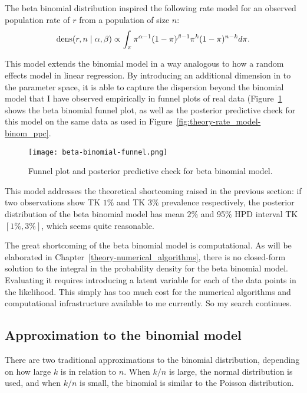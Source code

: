 The beta binomial distribution inspired the following rate model for
an observed population rate of $r$ from a population of size $n$:
\[
\operatorname{dens}(r,n\;|\; \alpha, \beta) \propto \int_{\pi}
\pi^{\alpha-1}(1-\pi)^{\beta-1} \pi^k (1-\pi)^{n-k}
d\pi.
\]

This model extends the binomial model in a way analogous to how a
random effects model in linear regression.  By introducing an
additional dimension in to the parameter space, it is able to capture
the dispersion beyond the binomial model that I have observed
empirically in funnel plots of real data
(Figure~\ref{fig:theory-rate_beta-binomial-funnel} shows the beta
binomial funnel plot, as well as the posterior predictive check for
this model on the same data as used in
Figure~\ref{fig:theory-rate_model-binom_ppc}.

\begin{figure}[ht]
\begin{center}
\texttt{[image: beta-binomial-funnel.png]}
\end{center}
\caption{Funnel plot and posterior predictive check for beta binomial model.}
\label{fig:theory-rate_beta-binomial-funnel}
\end{figure}

This model addresses the theoretical shortcoming raised in the
previous section: if two observations show TK $1\%$ and TK $3\%$ prevalence
respectively, the posterior distribution of the beta binomial model
has mean $2\%$ and 95\% HPD interval TK $[1\%,3\%]$, which seems quite
reasonable.

The great shortcoming of the beta binomial model is computational.  As
will be elaborated in Chapter~\ref{theory-numerical_algorithms}, there
is no closed-form solution to the integral in the probability density
for the beta binomial model.  Evaluating it requires introducing a
latent variable for each of the data points in the likelihood.  This
simply has too much cost for the numerical algorithms and
computational infrastructure available to me currently.  So my search
continues.

\subsection{Approximation to the binomial model}
There are two traditional approximations to the binomial distribution,
depending on how large $k$ is in relation to $n$.  When $k/n$ is
large, the normal distribution is used, and when $k/n$ is small, the
binomial is similar to the Poisson distribution.

